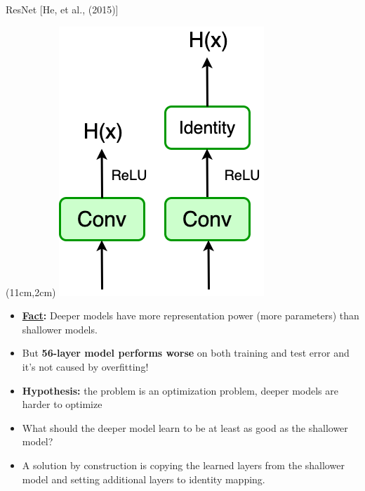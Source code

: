 \documentclass[serif, aspectratio=169]{beamer}
\begin{document}
\begin{frame}{ResNet [He, et al., (2015)]}
	
	\begin{textblock*}{5cm}(11cm,2cm) %
		\includegraphics[keepaspectratio, scale=0.4]{pic/Identity}
	\end{textblock*}
	
	\begin{itemize}
		\item \textbf{\underline{Fact}:} Deeper models have more representation \newline power (more parameters) than shallower models.
		\item But \textbf{56-layer model performs worse} on both training \newline and test error and it’s not caused by overfitting!
		\item \textbf{Hypothesis:} the problem is an optimization problem, \newline deeper models are harder to optimize
		\item \color{red} What should the deeper model learn to be at least \newline as good as the shallower model?
		\item \color{red} A solution by construction is copying the learned \newline layers from the shallower model and setting additional \newline layers to identity mapping.
	\end{itemize}
\end{frame}
\end{document}
